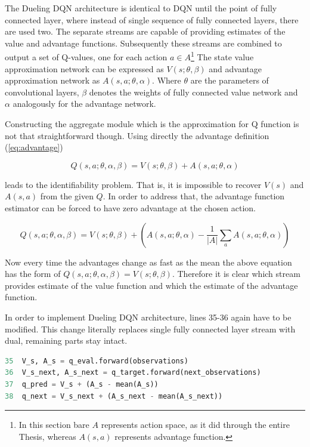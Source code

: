 The Dueling DQN architecture is identical to DQN until the point of fully connected layer, where instead of single sequence of fully
connected layers, there are used two. The separate streams are capable of providing estimates of the value and advantage functions.
Subsequently these streams are combined to output a set of Q-values, one for each action $a \in A$\footnote{In this section bare $A$
represents action space, as it did through the entire Thesis, whereas $A(s, a)$ represents advantage function.}
The state value approximation network can be expressed as $V(s; \theta, \beta)$ and advantage approximation network as $A(s, a; \theta,
\alpha)$. Where $\theta$ are the parameters of convolutional layers, $\beta$ denotes the weights of fully connected value network and
$\alpha$ analogously for the advantage network.

Constructing the aggregate module which is the approximation for Q function is not that straightforward though. Using directly the advantage definition (\ref{eq:advantage})

\begin{equation}
    Q(s, a; \theta, \alpha, \beta) = V(s; \theta, \beta) + A(s, a; \theta, \alpha)
\end{equation}

leads to the identifiability problem. That is, it is impossible to recover $V(s)$ and $A(s, a)$ from the given $Q$. In order to address
that, the advantage function estimator can be forced to have zero advantage at the chosen action.

\begin{equation}
    Q(s, a; \theta, \alpha, \beta) = V(s; \theta, \beta) + \left(A(s, a; \theta, \alpha) - \frac{1}{|A|} \sum_a A(s, a; \theta, \alpha)\right)
\end{equation}

Now every time the advantages change as fast as the mean the above equation has the form of $Q(s, a; \theta, \alpha, \beta) = V(s; \theta,
\beta)$. Therefore it is clear which stream provides estimate of the value function and which the estimate of the advantage function.

In order to implement Dueling DQN architecture, lines 35-36 again have to be modified. This change literally replaces single fully connected layer stream with dual, remaining parts stay intact.

\begin{lstlisting}[language=Python, caption={Dueling Deep Q-learning modification}]
35  V_s, A_s = q_eval.forward(observations)
36  V_s_next, A_s_next = q_target.forward(next_observations)
37  q_pred = V_s + (A_s - mean(A_s))
38  q_next = V_s_next + (A_s_next - mean(A_s_next))
\end{lstlisting}

